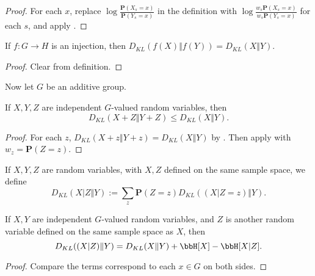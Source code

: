 \begin{proof}\leanok
For each $x$, replace $\log \frac{\mathbf{P}(X_s=x)}{\mathbf{P}(Y_s=x)}$ in the definition with $\log \frac{w_s\mathbf{P}(X_s=x)}{w_s\mathbf{P}(Y_s=x)}$ for each $s$, and apply .
\end{proof}


\begin{lemma}\label{kl-div-inj}\leanok  If $f:G \to H$ is an injection, then $D_{KL}(f(X)\Vert f(Y)) = D_{KL}(X\Vert Y)$.
\end{lemma}

\begin{proof}\leanok{} Clear from definition.
\end{proof}

Now let $G$ be an additive group.

\begin{lemma}\label{kl-sums}\leanok If $X, Y, Z$ are independent $G$-valued random variables, then
  $$D_{KL}(X+Z\Vert Y+Z) \leq D_{KL}(X\Vert Y).$$
\end{lemma}

\begin{proof}
For each $z$, $D_{KL}(X+z\Vert Y+z)=D_{KL}(X\Vert Y)$ by . Then apply  with $w_z=\mathbf{P}(Z=z)$.
\end{proof}

\begin{definition}\label{ckl-div}  \leanok
  If $X,Y,Z$ are random variables, with $X,Z$ defined on the same sample space, we define
$$ D_{KL}(X|Z \Vert  Y) := \sum_z \mathbf{P}(Z=z) D_{KL}( (X|Z=z) \Vert  Y).$$
\end{definition}

\begin{lemma}\label{kl-cond}\leanok If $X, Y$ are independent $G$-valued random variables, and $Z$ is another random variable defined on the same sample space as $X$, then
  $$D_{KL}((X|Z)\Vert Y) = D_{KL}(X\Vert Y) + \bbH[X] - \bbH[X|Z].$$
\end{lemma}

\begin{proof}
   Compare the terms correspond to each $x\in G$ on both sides.
\end{proof}

